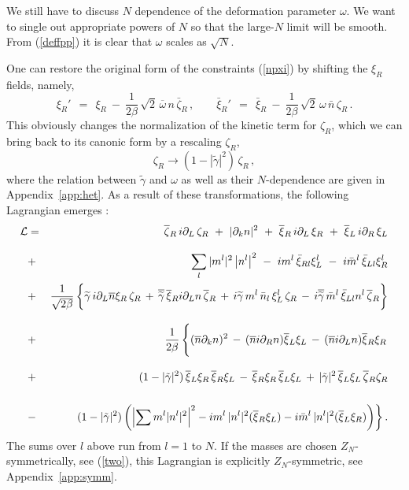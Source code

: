 \documentclass[epsfig,12pt]{article}
\def\beq{\begin{equation}}
\def\eeq{\end{equation}}
\def\beqn{\begin{eqnarray}}
\def\eeqn{\end{eqnarray}}
\newcommand{\cell}{{\mathcal L}}
\newcommand{\pt}{\partial}
\newcommand{\zn}{$Z_N$}
\def\beqn{\begin{eqnarray}}
\def\eeqn{\end{eqnarray}}
\def\beq{\begin{equation}}
\def\eeq{\end{equation}}
\newcommand{\p}{\partial}
\newcommand{\wt}{\widetilde}
\newcommand{\ov}{\overline}
\newcommand{\bxir}{\ov{\xi}{}_R}
\newcommand{\bxil}{\ov{\xi}{}_L}
\newcommand{\xir}{\xi_R}
\newcommand{\xil}{\xi_L}
\newcommand{\bzr}{\ov{\zeta}{}_R}
\newcommand{\zr}{\zeta_R}
\newcommand{\nbar}{\ov{n}}
\begin{document}
We still have to discuss  $N$ dependence of the deformation parameter $\omega$.
We want to single out appropriate powers of $N$ so that the large-$N$ limit will be smooth.
From (\ref{deffpp}) it is clear that $\omega$ scales as
$\sqrt N$.

One can restore the original form of 
the constraints (\ref{npxi})  by   shifting  the $ \xir $ fields, namely,
\beq
\xi_R' ~~=~~ \xir ~-~ \frac{1}{2\beta}\,\sqrt{2}\,\ov{\omega}\, n\, \bar\zeta_R\,, \qquad
\bar\xi_R' ~~=~~  \bar\xi_R ~-~ \frac{1}{2\beta}\,\sqrt{2}\,\omega\, \bar{n}\, \zeta_R\,.
\label{wtpi7}
\eeq
This obviously changes the normalization of the kinetic term for $ \zr $, which we can
bring back to its canonic form by a rescaling $ \zr $,
\beq
	\zr  \to   ( 1 - |\tilde\gamma|^2 )\, \zr\,,
	\label{wtpi8}
\eeq
where the relation between $\tilde\gamma$ and $\omega$ as well as their $N$-dependence
are given in Appendix~\ref{app:het}.
As a result of these transformations,  the following Lagrangian emerges \cite{BSY3}:
\beqn
\cell 
&=&
 \bzr\, i\pt_L\, \zr  ~+~ 
  | \pt_k n |^2 ~+~
 \bxir\, i\p_L\, \xir ~+~  \bxil\, i\p_R\, \xil 
	\nonumber\\[3mm]
&+&
  \sum_l |m^l|^2 \left|n^l \right|^2 
~-~ i m^l\, \bar{\xi}_{Rl} \xi_L^l ~-~ i\bar{m}^l\, \bar{\xi}_{Ll} \xi_R^l
\nonumber\\
&+& 
\frac{1}{\sqrt{2\beta}}\left\{\rule{0mm}{5mm}
\wt{\gamma}\, i\pt_L\nbar \xir\, \zr \,+\, \ov{\wt\gamma}\, \bxir i\p_L n\, \bzr
\,+\, i\wt{\gamma}\, m^l\, \bar{n}_l \, \xi_L^l\, \zr 
	\,-\, i\ov{\wt\gamma}\, \bar{m}^l\, \bar{\xi}_{Ll} n^l\, \bzr
		\right\}
\nonumber\\[3mm]
&+&
\frac{1}{2\beta} \left\{\rule{0mm}{6mm}
  (\nbar  \p_k n)^2
	\,-\,  (\nbar  i\p_R n)  \bxil \xil \,-\,  (\nbar  i\p_L n) \bxir \xir
	\right.
\nonumber\\[3mm]
&+& (1-|\tilde\gamma|^2)\,\bxil\xir\,\bxir\xil \,-\, \bxir\xir\,\bxil\xil
\,+\, |\tilde\gamma|^2\, \bxil \xil\, \bzr \zr
	\nonumber\\[5mm]
&-&
\left.
 (1-|\tilde\gamma|^2)
	\left(
	 \left|\sum m^l |n^l|^2 \right|^2 
		- i m^l\, |n^l|^2 (\bxir\xil) - i\bar{m}^l\, |n^l|^2(\bxil\xir)
	\right) \right\}.
	\label{sigma_phys}
\eeqn
The sums over $l$ above run from $l=1$ to $N$. If the masses are chosen \zn-symmetrically, see
(\ref{two}), this Lagrangian is explicitly \zn-symmetric, see  Appendix~\ref{app:symm}.
\end{document}
